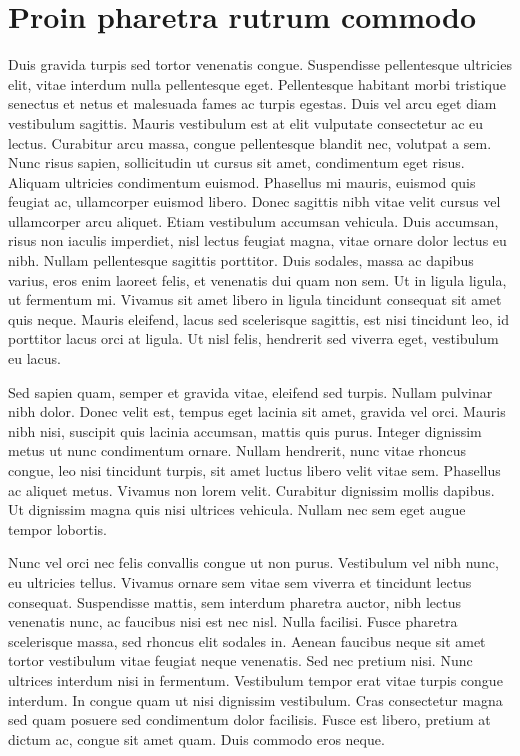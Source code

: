 \section{Proin pharetra rutrum commodo}
Duis gravida turpis sed tortor venenatis congue. Suspendisse pellentesque ultricies elit, vitae interdum nulla pellentesque eget. Pellentesque habitant morbi tristique senectus et netus et malesuada fames ac turpis egestas. Duis vel arcu eget diam vestibulum sagittis. Mauris vestibulum est at elit vulputate consectetur ac eu lectus. Curabitur arcu massa, congue pellentesque blandit nec, volutpat a sem. Nunc risus sapien, sollicitudin ut cursus sit amet, condimentum eget risus. Aliquam ultricies condimentum euismod. Phasellus mi mauris, euismod quis feugiat ac, ullamcorper euismod libero. Donec sagittis nibh vitae velit cursus vel ullamcorper arcu aliquet. Etiam vestibulum accumsan vehicula. Duis accumsan, risus non iaculis imperdiet, nisl lectus feugiat magna, vitae ornare dolor lectus eu nibh. Nullam pellentesque sagittis porttitor. Duis sodales, massa ac dapibus varius, eros enim laoreet felis, et venenatis dui quam non sem. Ut in ligula ligula, ut fermentum mi. Vivamus sit amet libero in ligula tincidunt consequat sit amet quis neque. Mauris eleifend, lacus sed scelerisque sagittis, est nisi tincidunt leo, id porttitor lacus orci at ligula. Ut nisl felis, hendrerit sed viverra eget, vestibulum eu lacus.

Sed sapien quam, semper et gravida vitae, eleifend sed turpis. Nullam pulvinar nibh dolor. Donec velit est, tempus eget lacinia sit amet, gravida vel orci. Mauris nibh nisi, suscipit quis lacinia accumsan, mattis quis purus. Integer dignissim metus ut nunc condimentum ornare. Nullam hendrerit, nunc vitae rhoncus congue, leo nisi tincidunt turpis, sit amet luctus libero velit vitae sem. Phasellus ac aliquet metus. Vivamus non lorem velit. Curabitur dignissim mollis dapibus. Ut dignissim magna quis nisi ultrices vehicula. Nullam nec sem eget augue tempor lobortis.

Nunc vel orci nec felis convallis congue ut non purus. Vestibulum vel nibh nunc, eu ultricies tellus. Vivamus ornare sem vitae sem viverra et tincidunt lectus consequat. Suspendisse mattis, sem interdum pharetra auctor, nibh lectus venenatis nunc, ac faucibus nisi est nec nisl. Nulla facilisi. Fusce pharetra scelerisque massa, sed rhoncus elit sodales in. Aenean faucibus neque sit amet tortor vestibulum vitae feugiat neque venenatis. Sed nec pretium nisi. Nunc ultrices interdum nisi in fermentum. Vestibulum tempor erat vitae turpis congue interdum. In congue quam ut nisi dignissim vestibulum. Cras consectetur magna sed quam posuere sed condimentum dolor facilisis. Fusce est libero, pretium at dictum ac, congue sit amet quam. Duis commodo eros neque.

